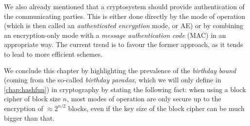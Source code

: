 We also already mentioned that a cryptosystem should provide authentication of the communicating parties. This is either done directly by the mode of operation (which is then
called an \emph{authenticated encryption} mode, or AE) or by combining an encryption-only mode with a \emph{message authentication code} (MAC) in an appropriate way. The current
trend is to favour the former approach, as it tends to lead to more efficient schemes.

We conclude this chapter by highlighting the prevalence of the \emph{birthday bound} (coming from the so-called \emph{birthday paradox}, which we will
only define in \autoref{chap:hashfun}) in cryptography by stating the following fact: when using a block cipher of block size $n$, most modes of operation are only
secure up to the encryption of $\approx 2^{n/2}$ blocks, even if the key size of the block cipher can be much bigger than that.
 

